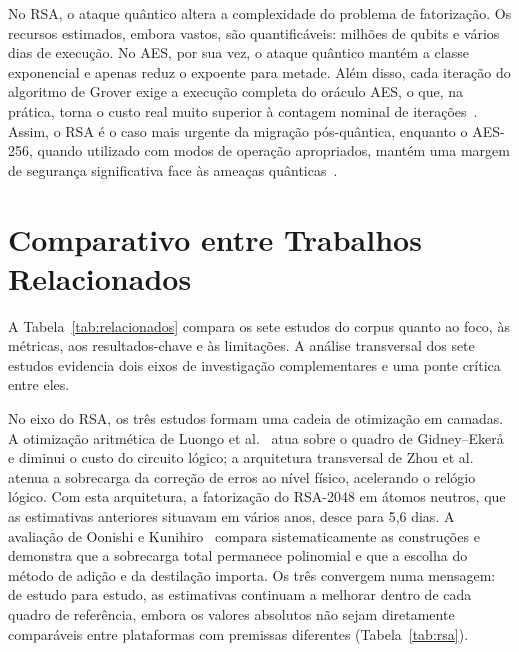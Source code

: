 \documentclass[11pt,a4paper]{article}
\begin{document}
No RSA, o ataque quântico altera a complexidade do problema de fatorização. Os recursos estimados, embora vastos, são quantificáveis: milhões de qubits e vários dias de execução. No AES, por sua vez, o ataque quântico mantém a classe exponencial e apenas reduz o expoente para metade. Além disso, cada iteração do algoritmo de Grover exige a execução completa do oráculo AES, o que, na prática, torna o custo real muito superior à contagem nominal de iterações~\cite{huang2022,liu2023}. 
Assim, o RSA é o caso mais urgente da migração pós-quântica, enquanto o AES-256, quando utilizado com modos de operação apropriados, mantém uma margem de segurança significativa face às ameaças quânticas~\cite{chethana2025}.

\clearpage

\section{Comparativo entre Trabalhos Relacionados}\label{sec:relacionados}

A Tabela~\ref{tab:relacionados} compara os sete estudos do corpus quanto ao foco, às métricas, aos resultados-chave e às limitações. A análise transversal dos sete estudos evidencia dois eixos de investigação complementares e uma ponte crítica entre eles.

No eixo do RSA, os três estudos formam uma cadeia de otimização em camadas. A otimização aritmética de Luongo et al.~\cite{luongo2025} atua sobre o quadro de Gidney--Ekerå e diminui o custo do circuito lógico; a arquitetura transversal de Zhou et al.~\cite{zhou2025} atenua a sobrecarga da correção de erros ao nível físico, acelerando o relógio lógico. Com esta arquitetura, a fatorização do RSA-2048 em átomos neutros, que as estimativas anteriores situavam em vários anos, desce para 5,6 dias. A avaliação de Oonishi e Kunihiro~\cite{oonishi2026} compara sistematicamente as construções e demonstra que a sobrecarga total permanece polinomial e que a escolha do método de adição e da destilação importa. Os três convergem numa mensagem: de estudo para estudo, as estimativas continuam a melhorar dentro de cada quadro de referência, embora os valores absolutos não sejam diretamente comparáveis entre plataformas com premissas diferentes (Tabela~\ref{tab:rsa}).
\end{document}
